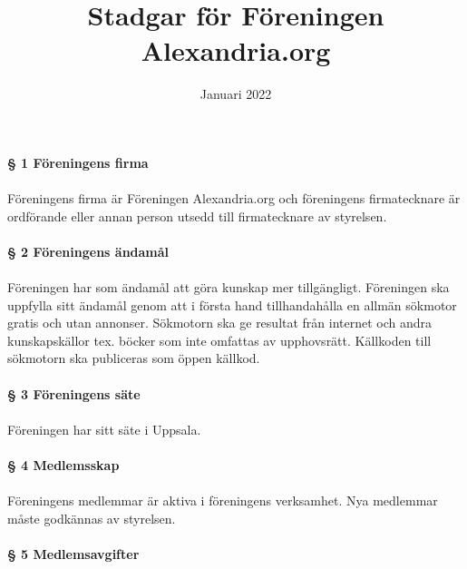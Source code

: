 \documentclass[12pt, a4paper]{article}
\title{Stadgar för Föreningen Alexandria.org}
\date{Januari 2022}
\begin{document}
\maketitle

\paragraph{§ 1 Föreningens firma}
\paragraph{}
Föreningens firma är Föreningen Alexandria.org och föreningens firmatecknare är ordförande eller annan person utsedd till firmatecknare av styrelsen.

\paragraph{§ 2 Föreningens ändamål}
\paragraph{}
Föreningen har som ändamål att göra kunskap mer tillgängligt. Föreningen ska uppfylla sitt ändamål genom att i första hand tillhandahålla en allmän sökmotor gratis och utan annonser. Sökmotorn ska ge resultat från internet och andra kunskapskällor tex. böcker som inte omfattas av upphovsrätt. Källkoden till sökmotorn ska publiceras som öppen källkod.

\paragraph{§ 3 Föreningens säte}
\paragraph{}
Föreningen har sitt säte i Uppsala.

\paragraph{§ 4 Medlemsskap}
\paragraph{}
Föreningens medlemmar är aktiva i föreningens verksamhet. Nya medlemmar måste godkännas av styrelsen.

\paragraph{§ 5 Medlemsavgifter}
\end{document}
